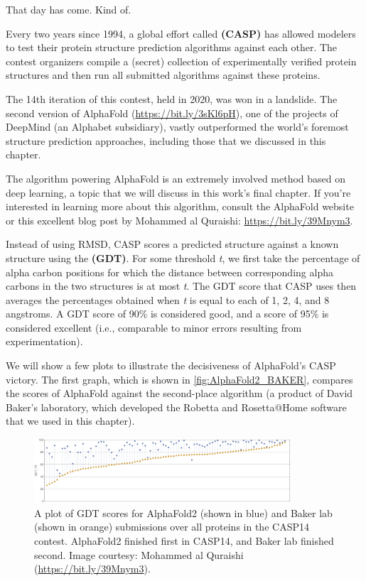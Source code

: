 That day has come. Kind of.

Every two years since 1994, a global effort called  \textbf{(CASP)} has allowed modelers to test their protein structure prediction algorithms against each other. The contest organizers compile a (secret) collection of experimentally verified protein structures and then run all submitted algorithms against these proteins.

The 14th iteration of this contest, held in 2020, was won in a landslide. The second version of AlphaFold (\url{https://bit.ly/3sKl6pH}), one of the projects of DeepMind (an Alphabet subsidiary), vastly outperformed the world's foremost structure prediction approaches, including those that we discussed in this chapter.

The algorithm powering AlphaFold is an extremely involved method based on deep learning, a topic that we will discuss in this work's final chapter. If you're interested in learning more about this algorithm, consult the AlphaFold website or this excellent blog post by Mohammed al Quraishi: \url{https://bit.ly/39Mnym3}.

Instead of using RMSD, CASP scores a predicted structure against a known structure using the  \textbf{(GDT)}. For some threshold \textit{t}, we first take the percentage of alpha carbon positions for which the distance between corresponding alpha carbons in the two structures is at most \textit{t}. The GDT score that CASP uses then averages the percentages obtained when \textit{t} is equal to each of 1, 2, 4, and 8 angstroms. A GDT score of 90\% is considered good, and a score of 95\% is considered excellent (i.e., comparable to minor errors resulting from experimentation).

We will show a few plots to illustrate the decisiveness of AlphaFold's CASP victory. The first graph, which is shown in \autoref{fig:AlphaFold2_BAKER}, compares the scores of AlphaFold against the second-place algorithm (a product of David Baker's laboratory, which developed the Robetta and Rosetta@Home software that we used in this chapter).\\

\begin{figure}[h]
	\centering
	\mySfFamily
	\includegraphics[width = 0.85\textwidth]{../images/AlphaFold2_BAKER.png}
	\caption{A plot of GDT scores for AlphaFold2 (shown in blue) and Baker lab (shown in orange) submissions over all proteins in the CASP14 contest. AlphaFold2 finished first in CASP14, and Baker lab finished second. Image courtesy: Mohammed al Quraishi (\url{https://bit.ly/39Mnym3}).}
	\label{fig:AlphaFold2_BAKER}
\end{figure}

